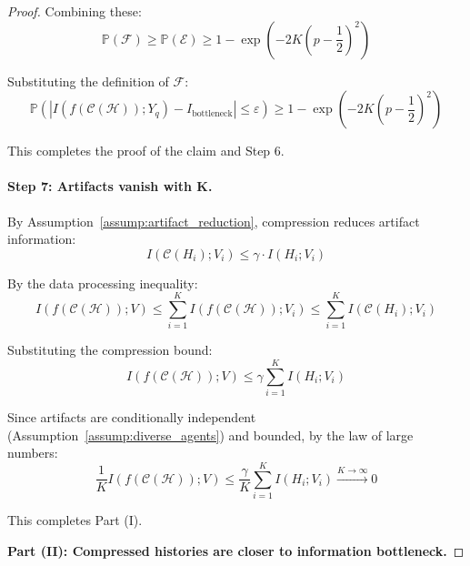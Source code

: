 \documentclass{article}
\theoremstyle{plain}
\theoremstyle{definition}
\theoremstyle{remark}
\begin{document}
\begin{proof}
Combining these:
\begin{equation}
\mathbb{P}(\mathcal{F}) \geq \mathbb{P}(\mathcal{E}) \geq 1 - \exp\left(-2K\left(p - \frac{1}{2}\right)^2\right)
\end{equation}

Substituting the definition of $\mathcal{F}$:
\begin{equation}
\mathbb{P}(|I(f(\mathcal{C}(\mathcal{H})); Y_q) - I_{\text{bottleneck}}| \leq \varepsilon) \geq 1 - \exp\left(-2K\left(p - \frac{1}{2}\right)^2\right)
\end{equation}

This completes the proof of the claim and Step 6.

\paragraph{Step 7: Artifacts vanish with K.}

By Assumption~\ref{assump:artifact_reduction}, compression reduces artifact information:
\begin{equation}
I(\mathcal{C}(H_i); V_i) \leq \gamma \cdot I(H_i; V_i)
\end{equation}

By the data processing inequality:
\begin{equation}
I(f(\mathcal{C}(\mathcal{H})); V) \leq \sum_{i=1}^K I(f(\mathcal{C}(\mathcal{H})); V_i) \leq \sum_{i=1}^K I(\mathcal{C}(H_i); V_i)
\end{equation}

Substituting the compression bound:
\begin{equation}
I(f(\mathcal{C}(\mathcal{H})); V) \leq \gamma \sum_{i=1}^K I(H_i; V_i)
\end{equation}

Since artifacts are conditionally independent (Assumption~\ref{assump:diverse_agents}) and bounded, by the law of large numbers:
\begin{equation}
\frac{1}{K} I(f(\mathcal{C}(\mathcal{H})); V) \leq \frac{\gamma}{K} \sum_{i=1}^K I(H_i; V_i) \xrightarrow{K \to \infty} 0
\end{equation}

This completes Part (I).


\textbf{Part (II): Compressed histories are closer to information bottleneck.}


\end{proof}
\end{document}
